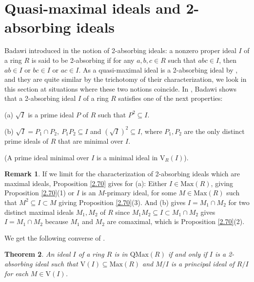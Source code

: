 \documentclass[12pt,leqno]{amsart}
\newtheorem{theorem}{Theorem}[section]
\theoremstyle{definition}
\newtheorem{remark}[theorem]{Remark}
\begin{document}
\section{Quasi-maximal ideals and 2-absorbing ideals}

Badawi introduced in \cite{Ba} the notion of 2-absorbing ideals: a nonzero proper ideal $I$ of a ring $R$ is said to be 2-absorbing if for any $a,b,c\in R$ such that $abc\in I$, then $ab\in I$ or $bc\in I$ or $ac\in I$. As a 
quasi-maximal ideal is a 2-absorbing ideal by \cite[Theorem 1]{AKKT}, and they are quite similar by the trichotomy of their characterization, we look in this section at situations where these two notions coincide. In \cite[Theorem 2.4]{Ba}, Badawi shows that a 2-absorbing ideal $I$ of a ring $R$ satisfies one of the next properties:

(a) $\sqrt I$ is a prime ideal $P$ of $R$ such that $P^2\subseteq I$.

(b) $\sqrt I=P_1\cap P_2,\ P_1P_2\subseteq I$ and $(\sqrt I)^2\subseteq I$, where $P_1,P_2$ are the only distinct prime ideals of $R$ that are minimal over $I$.

(A prime ideal minimal over $I$ is a minimal ideal in 
 $\mathrm{V}_R(I)$).
 
\begin{remark}\label{5.1} If we limit for the characterization of 2-absorbing ideals which are maximal ideals, Proposition \ref{2.70} gives for (a): Either $I\in\mathrm{Max}(R)$, giving Proposition \ref{2.70}(1) or $I$ is an $M$-primary ideal, for some $M\in\mathrm{Max}(R)$ such that $M^2\subseteq I\subset M$ giving Proposition \ref{2.70}(3). And (b) gives $I=M_1\cap M_2 $ for two distinct maximal ideals $M_1,M_2$ of $R$ since $M_1M_2 \subseteq I\subset M_1\cap M_2$ gives $I=M_1\cap M_2$ because $M_1$ and $M_2$ are comaximal, which is Proposition \ref{2.70}(2).
\end{remark}
 
We get the following converse of \cite[Theorem 1]{AKKT}.

\begin{theorem}\label{5.2} An ideal $I$ of a ring $R$ is in $\mathrm{QMax}(R)$ if and only if $I$ is a 2-absorbing ideal such that $\mathrm{V}(I)\subseteq\mathrm{Max}(R)$ and $M/I$ is a principal ideal of $R/I$ for each $M\in \mathrm{V}(I)$. 
\end{theorem}
\end{document}
